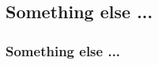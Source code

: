 \documentclass[12pt,a4paper]{article}%
\begin{document}




\subsection{Something else ... }

\subsubsection{Something else ... }
\end{document}

